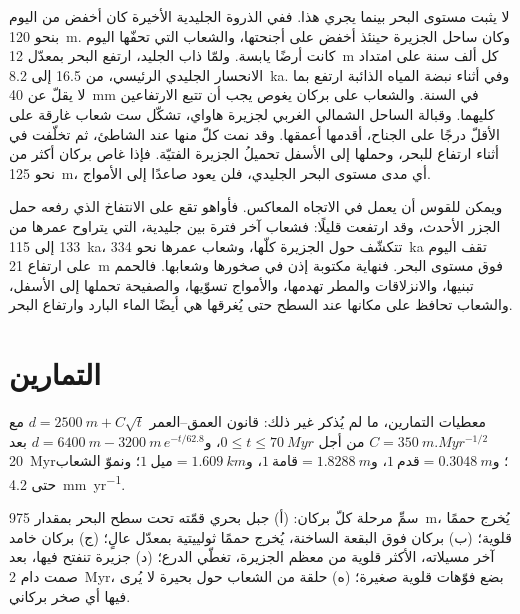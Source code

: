 لا يثبت مستوى البحر بينما يجري هذا. ففي الذروة الجليدية الأخيرة كان أخفض من اليوم بنحو
\qty{120}{m}. وكان ساحل الجزيرة حينئذ أخفض على أجنحتها، والشعاب
التي تحفّها اليوم كانت أرضًا يابسة. ولمّا ذاب الجليد، ارتفع البحر بمعدّل \qty{12}{m}
كل ألف سنة على امتداد الانحسار الجليدي الرئيسي، من 16.5 إلى \qty{8.2}{ka}. وفي أثناء نبضة المياه
الذائبة  ارتفع بما لا يقلّ عن \qty{40}{mm} في السنة. والشعاب على بركان يغوص يجب أن تتبع
الارتفاعين كليهما. وقبالة الساحل الشمالي الغربي لجزيرة هاواي، تشكّل ست شعاب غارقة على الأقلّ
درجًا على الجناح، أقدمها أعمقها. وقد نمت كلّ منها عند الشاطئ، ثم تخلّفت في أثناء ارتفاع
للبحر، وحملها إلى الأسفل تحميلُ الجزيرة الفتيّة. فإذا غاص بركان أكثر
من نحو \qty{125}{m}، أي مدى مستوى البحر الجليدي، فلن يعود صاعدًا إلى الأمواج.

ويمكن للقوس أن يعمل في الاتجاه المعاكس. فأواهو تقع على الانتفاخ الذي رفعه حمل الجزر الأحدث،
وقد ارتفعت قليلًا: فشعاب آخر فترة بين جليدية، التي يتراوح عمرها من 133 إلى \qty{115}{ka}، تتكشّف حول
الجزيرة كلّها، وشعاب عمرها نحو \qty{334}{ka} تقف اليوم على ارتفاع \qty{21}{m} فوق مستوى البحر.
فنهاية  مكتوبة إذن في صخورها وشعابها. فالحمم تبنيها، والانزلاقات
والمطر تهدمها، والأمواج تسوّيها، والصفيحة تحملها إلى الأسفل، والشعاب تحافظ على مكانها عند
السطح حتى يُغرقها هي أيضًا الماء البارد وارتفاع البحر.

\section*{التمارين}\label{sec:b2:oceanic-islands:exercises}

معطيات التمارين، ما لم يُذكر غير ذلك: قانون العمق--العمر $d = \qty{2500}{m} + C\sqrt t$ مع
$C = \qty{350}{m.Myr^{-1/2}}$ من أجل $0 \le t \le \qty{70}{Myr}$، و$d = \qty{6400}{m} -
\qty{3200}{m}\,e^{-t/62.8}$ بعد \qty{20}{Myr}؛ و$1~\text{قدم} = \qty{0.3048}{m}$، و$1~\text{قامة}
= \qty{1.8288}{m}$، و$1~\text{ميل} = \qty{1.609}{km}$؛ ونموّ الشعاب حتى \qty{4.2}{mm.yr^{-1}}.

\begin{exercise}[$\star$]\label{exo:b2:oceanic-islands:1}
سمِّ مرحلة كلّ بركان: (أ) جبل بحري قمّته تحت سطح البحر بمقدار \qty{975}{m}، يُخرج
حممًا قلوية؛ (ب) بركان فوق البقعة الساخنة، يُخرج حممًا ثولييتية بمعدّل عالٍ؛ (ج) بركان
خامد آخر مسيلاته، الأكثر قلوية من معظم الجزيرة، تغطّي الدرع؛ (د) جزيرة
تنفتح فيها، بعد صمت دام \qty{2}{Myr}، بضع فوّهات قلوية صغيرة؛ (ه) حلقة من الشعاب
حول بحيرة لا يُرى فيها أي صخر بركاني.
\end{exercise}

